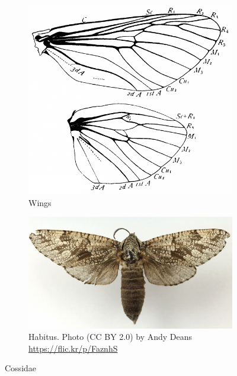 \documentclass[letterpaper, 11pt]{article}
\begin{document}
\begin{figure}[ht!]
    \centering
    \begin{subfigure}[ht!]{0.35\textwidth}
        \includegraphics[width=\textwidth]{CossidWings}
        \caption{Wings \citep[Fig. 343]{comstock1918wings}}
        \label{fig:cossid1}
    \end{subfigure}
    \hfill %
    \begin{subfigure}[ht!]{0.5\textwidth}
        \includegraphics[width=\textwidth]{CossidaeHabitus}
        \caption{Habitus. Photo (CC BY 2.0) by Andy Deans \url{https://flic.kr/p/FaznhS}}
        \label{fig:cossid2}
    \end{subfigure}
    \caption{Cossidae}\label{fig:cossids}
\end{figure}
\end{document}
